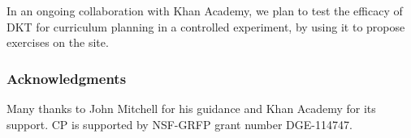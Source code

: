 In an ongoing collaboration with Khan Academy, we plan to test the efficacy of DKT for curriculum planning in a controlled experiment, by using it to propose exercises on the site. 


 \subsubsection*{Acknowledgments}


Many thanks to John Mitchell for his guidance and Khan Academy for its support. CP is supported by NSF-GRFP grant number DGE-114747.

